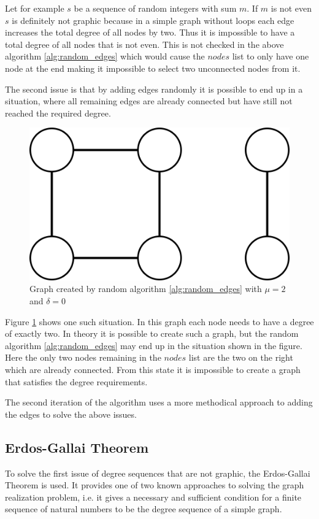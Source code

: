 Let for example $s$ be a sequence of random integers with sum $m$. If $m$ is not even $s$ is definitely not graphic because in a simple graph without loops each edge increases the total degree of all nodes by two. Thus it is impossible to have a total degree of all nodes that is not even. This is not checked in the above algorithm \ref{alg:random_edges} which would cause the $nodes$ list to only have one node at the end making it impossible to select two unconnected nodes from it.
\newline

The second issue is that by adding edges randomly it is possible to end up in a situation, where all remaining edges are already connected but have still not reached the required degree.

\begin{figure}
    \centering
    \includegraphics[width=0.5\linewidth]{images/impossible_graph.png}
    \caption{Graph created by random algorithm \ref{alg:random_edges} with $\mu=2$ and $\delta=0$}
    \label{fig:impossible_graph}
\end{figure}

Figure \ref{fig:impossible_graph} shows one such situation. In this graph each node needs to have a degree of exactly two. In theory it is possible to create such a graph, but the random algorithm \ref{alg:random_edges} may end up in the situation shown in the figure. Here the only two nodes remaining in the $nodes$ list are the two on the right which are already connected. From this state it is impossible to create a graph that satisfies the degree requirements.
\newline

The second iteration of the algorithm uses a more methodical approach to adding the edges to solve the above issues.

\subsection{Erdos-Gallai Theorem}
To solve the first issue of degree sequences that are not graphic, the Erdos-Gallai Theorem is used. It provides one of two known approaches to solving the graph realization problem, i.e. it gives a necessary and sufficient condition for a finite sequence of natural numbers to be the degree sequence of a simple graph.

